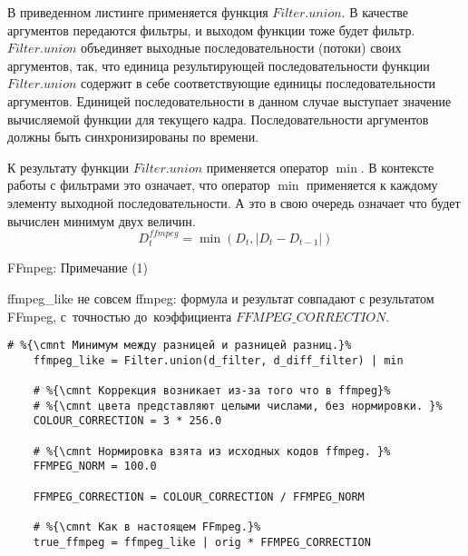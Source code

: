 \begin{note-frame}
    В приведенном листинге применяется функция $Filter.union$.
    В качестве аргументов передаются фильтры, 
    и выходом функции тоже будет фильтр. 
    $Filter.union$ объединяет выходные последовательности (потоки)
    своих аргументов, так, что единица результирующей  последовательности функции $Filter.union$ содержит 
    в себе соответствующие единицы последовательности аргументов.
    Единицей последовательности в данном случае выступает 
    значение вычисляемой функции для текущего кадра.
    Последовательности аргументов должны быть 
    синхронизированы по времени.
    
    К результату функции $Filter.union$ применяется оператор $\min$.
    В контексте работы с фильтрами это означает, что оператор $\min$
    применяется к каждому элементу выходной последовательности.
    А это в свою очередь означает что будет 
    вычислен минимум двух величин.
    \[
        D_{t}^{ffmpeg} = \min(D_t, \left|D_t - D_{t-1} \right|)
    \]
\end{note-frame}


\begin{frame}[fragile]{FFmpeg: Примечание (1)}
    
    \begin{gray-box}{ffmpeg\_like не совсем ffmpeg:}
        формула и результат совпадают с результатом FFmpeg, 
        с~точностью до~коэффициента $FFMPEG\_CORRECTION$.
    \end{gray-box}

    \begin{lstlisting}[language=FilterPython]
    # %{\cmnt Минимум между разницей и разницей разниц.}%
    ffmpeg_like = Filter.union(d_filter, d_diff_filter) | min
    
    # %{\cmnt Коррекция возникает из-за того что в ffmpeg}% 
    # %{\cmnt цвета представляют целыми числами, без нормировки. }%
    COLOUR_CORRECTION = 3 * 256.0
    
    # %{\cmnt Нормировка взята из исходных кодов ffmpeg. }% 
    FFMPEG_NORM = 100.0
    
    FFMPEG_CORRECTION = COLOUR_CORRECTION / FFMPEG_NORM
    
    # %{\cmnt Как в настоящем FFmpeg.}%
    true_ffmpeg = ffmpeg_like | orig * FFMPEG_CORRECTION
    \end{lstlisting}
\end{frame}

